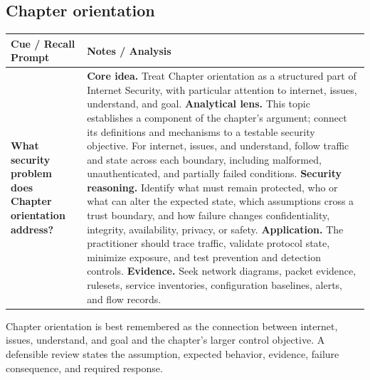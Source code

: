 \documentclass[11pt]{article}
\newcommand{\CornellHeader}{%
\rowcolor{Navy}\color{white}\bfseries Cue / Recall Prompt & \color{white}\bfseries Notes / Analysis\\\hline}
\newcommand{\CornellRow}[2]{%
\cellcolor{CueGray}\RaggedRight\textbf{#1} & \RaggedRight #2\\\hline}
\begin{document}
\subsection*{Chapter orientation}
\begin{longtable}{>{\RaggedRight\arraybackslash}p{}|>{\RaggedRight\arraybackslash}p{}}
\CornellHeader
\CornellRow{What security problem does Chapter orientation address?}{\textbf{Core idea.} Treat Chapter orientation as a structured part of Internet Security, with particular attention to internet, issues, understand, and goal. \textbf{Analytical lens.} This topic establishes a component of the chapter's argument; connect its definitions and mechanisms to a testable security objective. For internet, issues, and understand, follow traffic and state across each boundary, including malformed, unauthenticated, and partially failed conditions. \textbf{Security reasoning.} Identify what must remain protected, who or what can alter the expected state, which assumptions cross a trust boundary, and how failure changes confidentiality, integrity, availability, privacy, or safety. \textbf{Application.} The practitioner should trace traffic, validate protocol state, minimize exposure, and test prevention and detection controls. \textbf{Evidence.} Seek network diagrams, packet evidence, rulesets, service inventories, configuration baselines, alerts, and flow records.}
\end{longtable}
\begin{topicsummary}
Chapter orientation is best remembered as the connection between internet, issues, understand, and goal and the chapter's larger control objective. A defensible review states the assumption, expected behavior, evidence, failure consequence, and required response.
\end{topicsummary}
\end{document}

